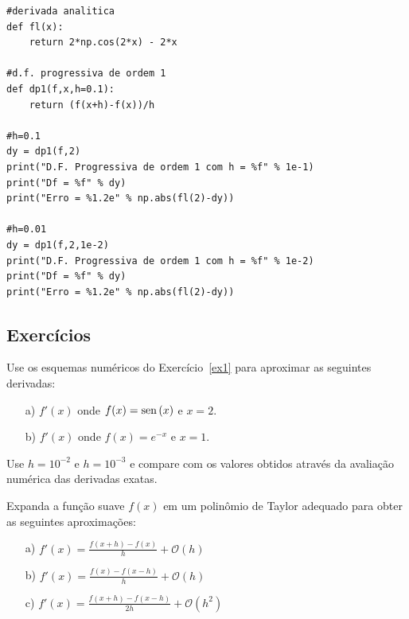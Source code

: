 \begin{resol}
\begin{verbatim}
#derivada analitica
def fl(x):
    return 2*np.cos(2*x) - 2*x

#d.f. progressiva de ordem 1
def dp1(f,x,h=0.1):
    return (f(x+h)-f(x))/h

#h=0.1
dy = dp1(f,2)
print("D.F. Progressiva de ordem 1 com h = %f" % 1e-1)
print("Df = %f" % dy)
print("Erro = %1.2e" % np.abs(fl(2)-dy))

#h=0.01
dy = dp1(f,2,1e-2)
print("D.F. Progressiva de ordem 1 com h = %f" % 1e-2)
print("Df = %f" % dy)
print("Erro = %1.2e" % np.abs(fl(2)-dy))
\end{verbatim}
\fi
\end{resol}


\subsection*{Exercícios}

\begin{exer}
Use os esquemas numéricos do Exercício~\ref{ex1} para aproximar as seguintes derivadas:
\begin{itemize}
\item[a)] $f'(x)$ onde $f(x)=\operatorname{sen}\,(x)$ e $x=2$.
\item[b)] $f'(x)$ onde $f(x)=e^{-x}$ e $x=1$.
\end{itemize}
Use $h=10^{-2}$ e $h=10^{-3}$ e compare com os valores obtidos através da avaliação numérica das derivadas exatas.
\end{exer}

\begin{exer}\label{ex1} Expanda a função suave $f(x)$ em um polinômio de Taylor adequado para obter as seguintes aproximações:
\begin{itemize}
\item[a)] $f'(x)=\frac{f(x+h)-f(x)}{h}+\mathcal{O}(h)$
\item[b)] $f'(x)=\frac{f(x)-f(x-h)}{h}+\mathcal{O}(h)$
\item[c)] $f'(x)=\frac{f(x+h)-f(x-h)}{2h}+\mathcal{O}(h^2)$
\end{itemize}
\end{exer}



